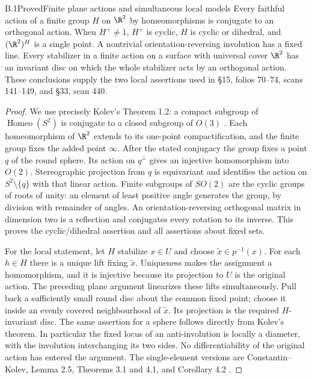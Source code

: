 \begin{claim}{B.1}{Proved}{Finite plane actions and simultaneous local models}
Every faithful action of a finite group $H$ on $\R^2$ by homeomorphisms is
conjugate to an orthogonal action. When $H^+\ne1$, $H^+$ is cyclic, $H$ is cyclic
or dihedral, and $(\R^2)^H$ is a single point. A nontrivial orientation-reversing
involution has a fixed line. Every stabilizer in a finite action on a surface
with universal cover $\R^2$ has an invariant disc on which the whole stabilizer
acts by an orthogonal action. These conclusions supply the two local assertions
used in \S15, folios 70--74, scans 141--149, and \S33, scan 440.
\end{claim}
\begin{proof}
We use precisely Kolev's Theorem 1.2: a compact subgroup of
$\operatorname{Homeo}(S^2)$ is conjugate to a closed subgroup of $O(3)$
\cite{bKolev2006}. Each homeomorphism of $\R^2$ extends to its one-point
compactification, and the finite group fixes the added point $\infty$.
After the stated conjugacy the group fixes a point $q$ of the round sphere.
Its action on $q^\perp$ gives an injective homomorphism into $O(2)$.
Stereographic projection from $q$ is equivariant and identifies the action on
$S^2\setminus\{q\}$ with that linear action. Finite subgroups of $SO(2)$ are the
cyclic groups of roots of unity: an element of least positive angle generates
the group, by division with remainder of angles. An orientation-reversing
orthogonal matrix in dimension two is a reflection and conjugates every rotation
to its inverse. This proves the cyclic/dihedral assertion and all assertions about
fixed sets.

For the local statement, let $H$ stabilize $x\in U$ and choose
$\widetilde x\in p^{-1}(x)$. For each $h\in H$ there is a unique lift fixing
$\widetilde x$. Uniqueness makes the assignment a homomorphism, and it is
injective because its projection to $U$ is the original action. The preceding
plane argument linearizes these lifts simultaneously. Pull back a sufficiently
small round disc about the common fixed point; choose it inside an evenly
covered neighbourhood of $\widetilde x$. Its projection is the required
$H$-invariant disc. The same assertion for a sphere follows directly from
Kolev's theorem. In particular the fixed locus of an anti-involution is locally
a diameter, with the involution interchanging its two sides. No differentiability
of the original action has entered the argument. The single-element versions
are Constantin--Kolev, Lemma 2.5, Theorems 3.1 and 4.1, and Corollary 4.2
\cite{bConstantinKolev1994}.
\end{proof}

